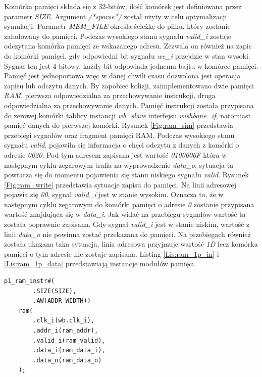 \documentclass[11pt,a4paper]{article}
\begin{document}
		Komórka pamięci składa się z 32-bitów, ilość komórek jest definiowana przez parametr \textit{SIZE}. Argument \textit{/*sparse*/} został użyty w celu optymalizacji symulacji. Parametr \textit{MEM\_FILE} określa ścieżkę do pliku, który zostanie załadowany do pamięci. Podczas wysokiego stanu sygnału \textit{valid\_i} zostaje odczytana komórka pamięci ze wskazanego adresu. Zezwala on również na zapis do komórki pamięci, gdy odpowiedni bit sygnału \textit{we\_i} przejdzie w stan wysoki. Sygnał ten jest 4-bitowy, każdy bit odpowiada jednemu bajtu w komórce pamięci. Pamięć jest jednoportowa więc w danej chwili czasu dozwolona jest operacja zapisu lub odczytu danych. By zapobiec kolizji, zaimplementowano dwie pamięci \textit{RAM}, pierwsza odpowiedzialna za przechowywanie instrukcji, druga odpowiedzialna za przechowywanie danych. Pamięć instrukcji została przypisana do zerowej komórki tablicy instancji \textit{wb\_slave} interfejsu \textit{wishbone\_if}, natomiast pamięć danych do pierwszej komórki. Rysunek \ref{Fig:ram_sim} przedstawia przebiegi sygnałów oraz fragment pamięci RAM. Podczas wysokiego stanu sygnału \textit{valid}, pojawiła się informacja o chęci odczytu z danych z komórki o adresie \textit{0020}. Pod tym adresem zapisana jest wartość \textit{0100006F} która w następnym cyklu zegarowym trafia na wyprowadzenie \textit{data\_o}, sytuacja ta powtarza się do momentu pojawienia się stanu niskiego sygnału \textit{valid}. Rysunek \ref{Fig:ram_write} przedstawia sytuacje zapisu do pamięci. Na linii adresowej pojawia się \textit{00}, sygnał \textit{valid\_i} jest w stanie wysokim. Oznacza to, że w następnym cyklu zegarowym do komórki pamięci o adresie \textit{0} zostanie przypisana wartość znajdująca się w \textit{data\_i}. Jak widać na przebiegu sygnałów wartość ta została poprawnie zapisana. Gdy sygnał \textit{valid\_i} jest w stanie niskim, wartość z linii \textit{data\_o} nie powinna zostać przekazana do pamięci. Na przebiegach również została ukazana taka sytuacja, linia adresowa przyjmuje wartość \textit{1D} lecz komórka pamięci o tym adresie nie zostaje zapisana. Listing \ref{Lis:ram_1p_in} i \ref{Lis:ram_1p_data} przedstawiają instancje modułów pamięci.\\
\begin{minipage}{.49\textwidth}
\begin{scriptsize}
\begin{lstlisting}[label=Lis:ram_1p_in,caption=Instancja pamięci instrukcji]
    p1_ram_instr#(
        .SIZE(SIZE),
        .AW(ADDR_WIDTH))
    ram(
        .clk_i(wb.clk_i),
        .addr_i(ram_addr),
        .valid_i(ram_valid),
        .data_i(ram_data_i),
        .data_o(ram_data_o)
    );
\end{lstlisting}
\end{scriptsize}
\end{minipage} \hspace{.02\textwidth}
\end{document}
